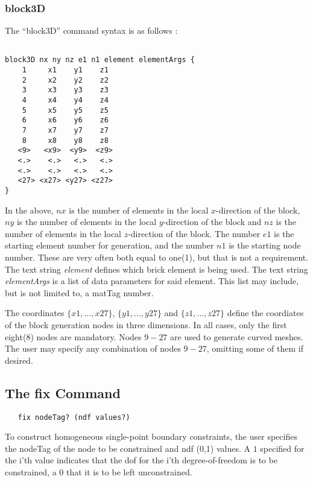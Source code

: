 \documentclass[12pt]{article}
\begin{document}
\subsubsection{block3D}
The ``block3D'' command syntax is as follows :
{\sf\small
\begin{verbatim}

block3D nx ny nz e1 n1 element elementArgs {
    1     x1    y1    z1 
    2     x2    y2    z2 
    3     x3    y3    z3 
    4     x4    y4    z4 
    5     x5    y5    z5 
    6     x6    y6    z6 
    7     x7    y7    z7 
    8     x8    y8    z8 
   <9>   <x9>  <y9>  <z9>   
   <.>    <.>   <.>   <.>
   <.>    <.>   <.>   <.>
   <27> <x27> <y27> <z27>
}
\end{verbatim}

}
In the above, $nx$ is the number of elements in the local $x$-direction of
the block,
$ny$ is the number of elements in the local $y$-direction of
the block and
$nz$ is the number of elements in the local $z$-direction of
the block.
The number $e1$ is the starting element number for generation, and 
the number $n1$ is the starting node number.  These are very often both equal to 
one(1), but that is not a requirement.  The text string {\em element} defines 
which brick element is being used.  The text string {\em elementArgs}
is a list of data parameters for said element.  This list may include, but is
not limited to, a matTag number.

The coordinates $\{x1,...,x27\}$, $\{y1,...,y27\}$ and $\{z1,...,z27\}$
define the coordiates
of the block generation nodes in three dimensions.  
In all cases, only the first eight(8) 
nodes are mandatory. Nodes $9-27$ are used to generate curved meshes.
The user may specify any combination of nodes $9-27$, omitting some of them
if desired.




\subsection{The fix Command}
{\sf\small
\begin{verbatim}
   fix nodeTag? (ndf values?)
\end{verbatim}
}

To construct homogeneous single-point boundary constraints, the user
specifies the nodeTag of the node to be constrained and ndf (0,1)
values. A $1$ specified for the i'th value indicates that the dof for
the i'th degree-of-freedom is to be constrained, a $0$ that it is to be
left unconstrained.
\end{document}
